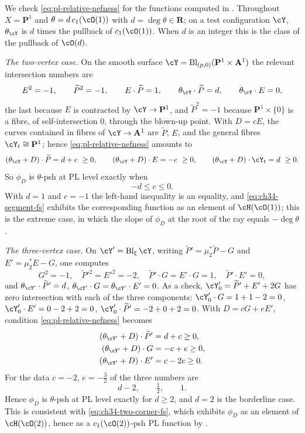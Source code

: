 \begin{example}
\label{ex:ch34-psh-check}
We check \eqref{eq:pl-relative-nefness} for the functions computed in
.  Throughout
$X=\mathbf P^1$ and $\theta=d\,c_1(\cO(1))$ with
$d=\deg\theta\in\mathbf R$; on a test configuration $\cY$,
$\theta_{\cY}$ is $d$ times the pullback of $c_1(\cO(1))$.
When $d$ is an integer this is the class of the pullback of $\cO(d)$.

\emph{The two-vertex case.}  On the smooth surface
$\cY=\operatorname{Bl}_{(p,0)}(\mathbf P^1\times\mathbf A^1)$ the relevant
intersection numbers are
\[
 E^2=-1,\qquad \widetilde P^2=-1,\qquad E\cdot\widetilde P=1,
 \qquad
 \theta_{\cY}\cdot\widetilde P=d,\qquad\theta_{\cY}\cdot E=0 ,
\]
the last because $E$ is contracted by $\cY\to\mathbf P^1$, and
$\widetilde P^2=-1$ because $\mathbf P^1\times\{0\}$ is a fibre, of
self-intersection $0$, through the blown-up point.  With $D=cE$, the
curves contained in fibres of $\cY\to\mathbf A^1$ are $\widetilde P$,
$E$, and the general fibres $\cY_t\cong\mathbf P^1$; hence
\eqref{eq:pl-relative-nefness} amounts to
\[
 (\theta_{\cY}+D)\cdot\widetilde P=d+c\ \ge0,
 \qquad
 (\theta_{\cY}+D)\cdot E=-c\ \ge0,
 \qquad
 (\theta_{\cY}+D)\cdot\cY_t=d\ \ge0 .
\]
So $\phi_D$ is $\theta$-psh at PL level exactly when
\begin{equation}
\label{eq:ch34-segment-psh-range}
 -d\le c\le0 .
\end{equation}
With $d=1$ and $c=-1$ the left-hand inequality is an equality, and
\eqref{eq:ch34-segment-fs} exhibits the corresponding function as an element
of $\cH(\cO(1))$; this is the extreme case, in which the slope of
$\phi_D$ at the root of the ray equals $-\deg\theta$.

\emph{The three-vertex case.}  On $\cY'=\operatorname{Bl}_\xi\cY$, writing
$\widetilde P'=\mu_2^*\widetilde P-G$ and $E'=\mu_2^*E-G$, one computes
\[
 G^2=-1,\quad \widetilde P'^2=E'^2=-2,\quad
 \widetilde P'\cdot G=E'\cdot G=1,\quad
 \widetilde P'\cdot E'=0,
\]
and $\theta_{\cY'}\cdot\widetilde P'=d$,
$\theta_{\cY'}\cdot G=\theta_{\cY'}\cdot E'=0$.  As a check,
$\cY'_0=\widetilde P'+E'+2G$ has zero intersection with each of the three
components:
$\cY'_0\cdot G=1+1-2=0$,
$\cY'_0\cdot E'=0-2+2=0$,
$\cY'_0\cdot\widetilde P'=-2+0+2=0$.
With $D=cG+eE'$, condition \eqref{eq:pl-relative-nefness} becomes
\begin{equation}
\label{eq:ch34-two-corner-nef}
 \begin{aligned}
  (\theta_{\cY'}+D)\cdot\widetilde P'&=d+c\ge0,\\
  (\theta_{\cY'}+D)\cdot G&=-c+e\ge0,\\
  (\theta_{\cY'}+D)\cdot E'&=c-2e\ge0.
 \end{aligned}
\end{equation}
For the data $c=-2$, $e=-\tfrac32$ of  the
three numbers are
\[
 d-2,\qquad \tfrac12,\qquad 1 .
\]
Hence $\phi_D$ is $\theta$-psh at PL level exactly for
$d\ge2$, and $d=2$ is the borderline case.  This is consistent with
\eqref{eq:ch34-two-corner-fs}, which exhibits $\phi_D$ as an element of
$\cH(\cO(2))$, hence as a $c_1(\cO(2))$-psh PL function by
.


\end{example}
